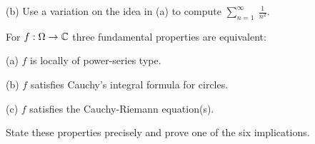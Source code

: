 \documentclass[bbb]{report}
\def\ds{\displaystyle}
\def\C{{\Bbb C}}
\begin{document}
\begin{Large}
\begin{description}
\vspace{.25in}
\item[\quad] (b)
Use a variation on the idea in (a) to compute $\ds\sum^\infty_{n=1}
\ \ds\frac{1}{n^2}$.

\vspace{.25in}
\item[8.]
For $f:\Omega\to\C$ three fundamental properties are equivalent:

\vspace{.1in}
\item[\quad] (a)
$f$ is locally of power-series type.

\vspace{.1in}
\item[\quad] (b)
$f$ satisfies Cauchy's integral formula for circles.

\vspace{.1in}
\item[\quad] (c)
$f$ satisfies the Cauchy-Riemann equation(s).

\item{\quad} State these properties precisely and prove one of the
six implications.

\vfill



\end{description}

\end{Large}
\end{document}
